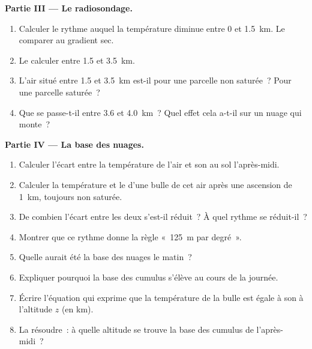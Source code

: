 \begin{problem}
\medskip
\noindent\textbf{Partie III --- Le radiosondage.}
\begin{enumerate}[resume]
  \item Calculer le rythme auquel la température diminue entre \num{0} et
        \qty{1.5}{km}. Le comparer au gradient sec.
  \item Le calculer entre \num{1.5} et \qty{3.5}{km}.
  \item L'air situé entre \num{1.5} et \qty{3.5}{km} est-il  pour une
        parcelle non saturée~? Pour une parcelle saturée~?
  \item Que se passe-t-il entre \num{3.6} et \qty{4.0}{km}~? Quel effet
        cela a-t-il sur un nuage qui monte~?
\end{enumerate}

\medskip
\noindent\textbf{Partie IV --- La base des nuages.}
\begin{enumerate}[resume]
  \item Calculer l'écart entre la température de l'air et son  au sol l'après-midi.
  \item Calculer la température et le  d'une bulle de cet
        air après une ascension de \qty{1}{km}, toujours non saturée.
  \item De combien l'écart entre les deux s'est-il réduit~? À quel rythme
        se réduit-il~?
  \item Montrer que ce rythme donne la règle «~\qty{125}{m} par degré~».
  \item Quelle aurait été la base des nuages le matin~?
  \item Expliquer pourquoi la base des cumulus s'élève au cours de la
        journée.
  \item Écrire l'équation qui exprime que la température de la bulle est
        égale à son  à l'altitude $z$ (en km).
  \item La résoudre~: à quelle altitude se trouve la base des cumulus de
        l'après-midi~?
\end{enumerate}
\end{problem}
